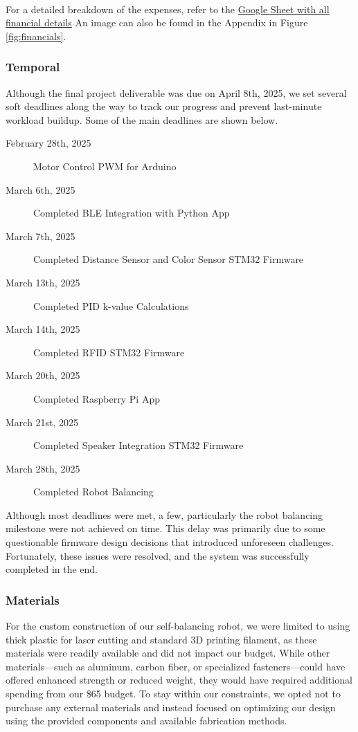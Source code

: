 \documentclass{article}
\begin{document}
\

For a detailed breakdown of the expenses, refer to the \href{https://docs.google.com/spreadsheets/d/1k2FMDTlyxH50N65zvA1Ss5obWOlDuc3JaWVVDWrQ88E/edit?usp=sharing}{Google Sheet with all financial details} An image can also be found in the Appendix in Figure \ref{fig:financials}.

\subsubsection{Temporal}

Although the final project deliverable was due on April 8th, 2025, we set several soft deadlines along the way to track our progress and prevent last-minute workload buildup. Some of the main deadlines are shown below.

\begin{description}
  \item[February 28th, 2025] Motor Control PWM for Arduino
  \item[March 6th, 2025] Completed BLE Integration with Python App
  \item[March 7th, 2025] Completed Distance Sensor and Color Sensor STM32 Firmware
  \item[March 13th, 2025] Completed PID k-value Calculations
  \item[March 14th, 2025] Completed RFID STM32 Firmware
  \item[March 20th, 2025] Completed Raspberry Pi App
  \item[March 21st, 2025] Completed Speaker Integration STM32 Firmware
  \item[March 28th, 2025] Completed Robot Balancing
\end{description}

Although most deadlines were met, a few, particularly the robot balancing milestone were not achieved on time. This delay was primarily due to some questionable firmware design decisions that introduced unforeseen challenges. Fortunately, these issues were resolved, and the system was successfully completed in the end.


\subsubsection{Materials}
For the custom construction of our self-balancing robot, we were limited to using thick plastic for laser cutting and standard 3D printing filament, as these materials were readily available and did not impact our budget. While other materials—such as aluminum, carbon fiber, or specialized fasteners—could have offered enhanced strength or reduced weight, they would have required additional spending from our \$65 budget. To stay within our constraints, we opted not to purchase any external materials and instead focused on optimizing our design using the provided components and available fabrication methods.
\end{document}
